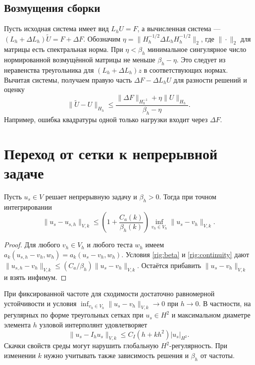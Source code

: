 \subsection{Возмущения сборки}
Пусть исходная система имеет вид $L_hU=F$, а вычисленная система ---
$(L_h+\Delta L_h)\widetilde U=F+\Delta F$. Обозначим
$\eta=\|H_h^{-1/2}\Delta L_hH_h^{-1/2}\|_2$, где $\|\cdot\|_2$ для
матрицы есть спектральная норма. При $\eta<\beta_h$ минимальное
сингулярное число нормированной возмущённой матрицы не меньше
$\beta_h-\eta$. Это следует из неравенства треугольника для
$(L_h+\Delta L_h)z$ в соответствующих нормах. Вычитая системы, получаем
правую часть $\Delta F-\Delta L_hU$ для разности решений и оценку
\begin{equation}
 \|\widetilde U-U\|_{H_h}
 \le\frac{\|\Delta F\|_{H_h^{-1}}+\eta\|U\|_{H_h}}{\beta_h-\eta}.
 \label{rig:operator-perturbation}
\end{equation}
Например, ошибка квадратуры одной только нагрузки входит через $\Delta F$.

\section{Переход от сетки к непрерывной задаче}
\label{rig:fem-convergence}

\begin{proposition}
Пусть $u_s\in V$ решает непрерывную задачу и $\beta_h>0$. Тогда при точном
интегрировании
\begin{equation}
 \|u_s-u_{s,h}\|_{V,k}\le
 \left(1+\frac{C_a(k)}{\beta_h(k)}\right)
 \inf_{v_h\in V_h}\|u_s-v_h\|_{V,k}.\label{rig:quasi-galerkin}
\end{equation}
\end{proposition}
\begin{proof}
Для любого $v_h\in V_h$ и любого теста $w_h$ имеем
$a_k(u_{s,h}-v_h,w_h)=a_k(u_s-v_h,w_h)$. Условия \eqref{rig:beta}
и \eqref{rig:continuity} дают
$\|u_{s,h}-v_h\|_{V,k}\le (C_a/\beta_h)\|u_s-v_h\|_{V,k}$.
Остаётся прибавить $\|u_s-v_h\|_{V,k}$ и взять инфимум.
\end{proof}
При фиксированной частоте для сходимости достаточно равномерной
устойчивости и условия $\inf_{v_h\in V_h}\|u_s-v_h\|_{V,k}\to0$ при $h\to0$.
В частности, на регулярных по форме треугольных сетках при $u_s\in H^2$
и максимальном диаметре элемента $h$ узловой интерполянт удовлетворяет
\begin{equation}
 \|u_s-I_hu_s\|_{V,k}\le C_I(h+kh^2)|u_s|_{H^2}.\label{rig:interpolation}
\end{equation}
Скачки свойств среды могут нарушить глобальную $H^2$-регулярность.
При изменении $k$ нужно учитывать также зависимость решения и $\beta_h$
от частоты.

